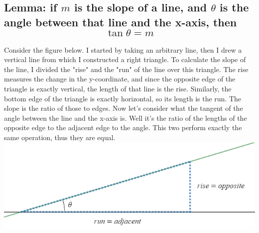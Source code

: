 \documentclass[11pt, oneside]{article}   	%
\begin{document}
\subsection{Lemma: if $m$ is the slope of a line, and $\theta$ is the angle between that line and the x-axis,
then $$\tan\theta = m$$}
	Consider the figure below. I started by taking an arbitrary line, then I drew a vertical line from which 
	I constructed a right triangle. To calculate the slope of the line, I divided the "rise" and the "run"
	of the line over this triangle. The rise measures the change in the y-coordinate, and since the opposite
	edge of the triangle is exactly vertical, the length of that line is the rise. Similarly, the bottom edge
	of the triangle is exactly horizontal, so its length is the run. The slope is the ratio of those to edges.
	Now let's consider what the tangent of the angle between the line and the x-axis is. Well it's the ratio of
	the lengths of the opposite edge to the adjacent edge to the angle. This two perform exactly the same 
	operation, thus they are equal.
	\includegraphics{2.3 visual aid clean.png}
\end{document}
